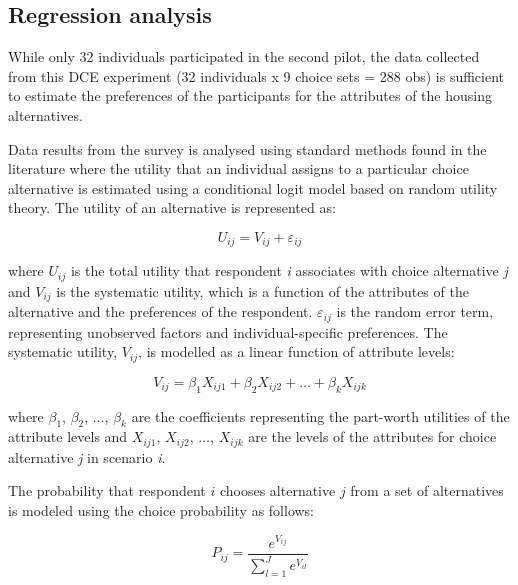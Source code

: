 \documentclass[
]{article}
\begin{document}
\hypertarget{regression-analysis}{%
\subsection{Regression analysis}\label{regression-analysis}}

While only 32 individuals participated in the second pilot, the data
collected from this DCE experiment (32 individuals x 9 choice sets = 288
obs) is sufficient to estimate the preferences of the participants for
the attributes of the housing alternatives.

Data results from the survey is analysed using standard methods found in
the literature where the utility that an individual assigns to a
particular choice alternative is estimated using a conditional logit
model based on random utility theory. The utility of an alternative is
represented as:

\begin{equation}
U_{ij} = V_{ij} + \varepsilon_{ij}
\end{equation}

\noindent where \(U_{ij}\) is the total utility that respondent
\textit{i} associates with choice alternative \textit{j} and \(V_{ij}\)
is the systematic utility, which is a function of the attributes of the
alternative and the preferences of the respondent. \(\varepsilon_{ij}\)
is the random error term, representing unobserved factors and
individual-specific preferences. The systematic utility, \(V_{ij}\), is
modelled as a linear function of attribute levels:

\begin{equation}
V_{ij} = \beta_1 X_{ij1} + \beta_2 X_{ij2} + \ldots + \beta_k X_{ijk}
\end{equation}

\noindent where \(\beta_1\), \(\beta_2\), \(\ldots\), \(\beta_k\) are
the coefficients representing the part-worth utilities of the attribute
levels and \(X_{ij1}\), \(X_{ij2}\), \(\ldots\), \(X_{ijk}\) are the
levels of the attributes for choice alternative \textit{j} in scenario
\textit{i}.

\vspace{2mm}

\noindent The probability that respondent \(i\) chooses alternative
\(j\) from a set of alternatives is modeled using the choice probability
as follows:

\begin{equation}
P_{ij} = \frac{e^{V_{ij}}}{\sum_{l=1}^{J} e^{V_{il}}}
\end{equation}
\end{document}
